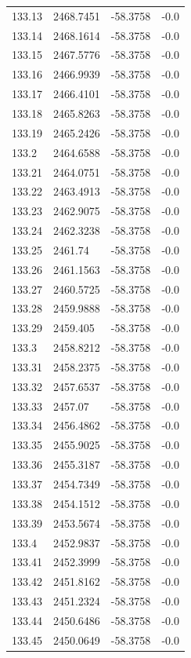 \begin{table}[H]
\begin{tabular}{llll}
133.13 & 2468.7451 & -58.3758 & -0.0 \\
133.14 & 2468.1614 & -58.3758 & -0.0 \\
133.15 & 2467.5776 & -58.3758 & -0.0 \\
133.16 & 2466.9939 & -58.3758 & -0.0 \\
133.17 & 2466.4101 & -58.3758 & -0.0 \\
133.18 & 2465.8263 & -58.3758 & -0.0 \\
133.19 & 2465.2426 & -58.3758 & -0.0 \\
133.2 & 2464.6588 & -58.3758 & -0.0 \\
133.21 & 2464.0751 & -58.3758 & -0.0 \\
133.22 & 2463.4913 & -58.3758 & -0.0 \\
133.23 & 2462.9075 & -58.3758 & -0.0 \\
133.24 & 2462.3238 & -58.3758 & -0.0 \\
133.25 & 2461.74 & -58.3758 & -0.0 \\
133.26 & 2461.1563 & -58.3758 & -0.0 \\
133.27 & 2460.5725 & -58.3758 & -0.0 \\
133.28 & 2459.9888 & -58.3758 & -0.0 \\
133.29 & 2459.405 & -58.3758 & -0.0 \\
133.3 & 2458.8212 & -58.3758 & -0.0 \\
133.31 & 2458.2375 & -58.3758 & -0.0 \\
133.32 & 2457.6537 & -58.3758 & -0.0 \\
133.33 & 2457.07 & -58.3758 & -0.0 \\
133.34 & 2456.4862 & -58.3758 & -0.0 \\
133.35 & 2455.9025 & -58.3758 & -0.0 \\
133.36 & 2455.3187 & -58.3758 & -0.0 \\
133.37 & 2454.7349 & -58.3758 & -0.0 \\
133.38 & 2454.1512 & -58.3758 & -0.0 \\
133.39 & 2453.5674 & -58.3758 & -0.0 \\
133.4 & 2452.9837 & -58.3758 & -0.0 \\
133.41 & 2452.3999 & -58.3758 & -0.0 \\
133.42 & 2451.8162 & -58.3758 & -0.0 \\
133.43 & 2451.2324 & -58.3758 & -0.0 \\
133.44 & 2450.6486 & -58.3758 & -0.0 \\
133.45 & 2450.0649 & -58.3758 & -0.0 \\

\end{tabular}
\end{table}
